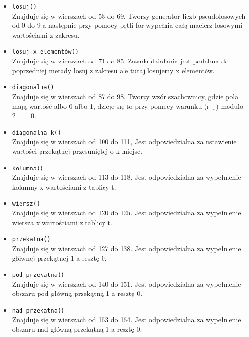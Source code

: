 \begin{itemize}
    \item \texttt{losuj()}\\
    Znajduje się w wierszach od 58 do 69.
    Tworzy generator liczb pseudolosowych od 0 do 9 a następnie przy pomocy pętli for wypełnia całą macierz losowymi wartościami z zakresu.

    \item \texttt{losuj\_x\_elementów()}\\
    Znajduje się w wierszach od 71 do 85.
    Zasada działania jest podobna do poprzedniej metody losuj z zakresu ale tutaj losujemy x elementów.

    \item \texttt{diagonalna()}\\
    Znajduje się w wierszach od 87 do 98.
    Tworzy wzór szachownicy, gdzie pola mają wartość albo 0 albo 1, dzieje się to przy pomocy warunku (i+j) modulo 2 == 0.

    \item \texttt{diagonalna\_k()}\\
    Znajduje się w wierszach od 100 do 111,
    Jest odpowiedzialna za ustawienie wartości przekątnej przesuniętej o k miejsc.
    
    \item \texttt{kolumna()}\\
    Znajduje się w wierszach od 113 do 118.
    Jest odpowiedzialna za wypełnienie kolumny k wartościami z tablicy t.
    
    \item \texttt{wiersz()}\\
    Znajduje się w wierszach od 120 do 125.
    Jest odpowiedzialna za wypełnienie wiersza x wartościami z tablicy t.
    
    \item \texttt{przekatna()}\\
    Znajduje się w wierszach od 127 do 138.
    Jest odpowiedzialna za wypełnienie głównej przekątnej 1 a resztę 0.
    
    \item \texttt{pod\_przekatna()}\\
    Znajduje się w wierszach od 140 do 151.
    Jest odpowiedzialna za wypełnienie obszaru pod główną przekątną 1 a resztę 0.
    
    \item \texttt{nad\_przekatna()}\\
    Znajduje się w wierszach od 153 do 164.
    Jest odpowiedzialna za wypełnienie obszaru nad główną przekątną 1 a resztę 0.
    

\end{itemize}
